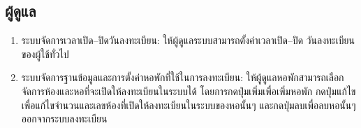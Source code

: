 \subsection{ผู้ดูแล}
\begin{enumerate}
  \item ระบบจัดการเวลาเปิด--ปิดวันลงทะเบียน: ให้ผู้ดูแลระบบสามารถตั้งค่าเวลาเปิด--ปิด
  วันลงทะเบียนของผู้ใช้ทั่วไป

  \clearpage
  \item ระบบจัดการฐานข้อมูลและการตั้งค่าหอพักที่ใช้ในการลงทะเบียน: ให้ผู้ดูแลหอพักสามารถเลือกจัดการห้องและหอที่จะเปิดให้ลงทะเบียนในระบบได้
      โดยการกดปุ่มเพิ่มเพื่อเพิ่มหอพัก กดปุ่มแก้ไขเพื่อแก้ไขจำนวนและเลขห้องที่เปิดให้ลงทะเบียนในระบบของหอนั้นๆ และกดปุ่มลบเพื่อลบหอนั้นๆออกจากระบบลงทะเบียน
  

\end{enumerate}
